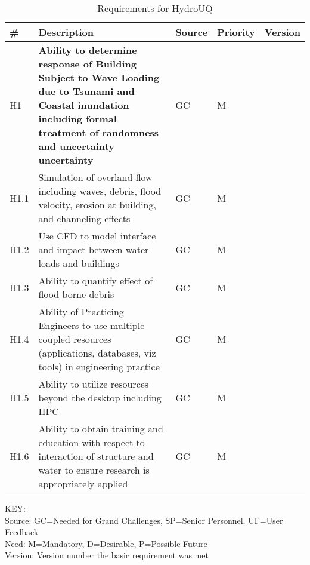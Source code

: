 \begin{longtable}{| p{} | p{} | p{} | p{} |  p{} |}
            
                               \caption{Requirements for HydroUQ} 
\label{tab:featureRequirements}    
 \\
   \hline
\rowcolor{lightgray}
       \# & Description & Source & Priority & Version \\ \hline
       
H1 & \textbf{Ability to determine response of Building Subject to Wave Loading due to Tsunami and Coastal inundation including formal treatment of randomness and uncertainty uncertainty} & GC & M &  \\ \hline
H1.1 & Simulation of overland flow including waves, debris, flood velocity, erosion at building, and channeling effects & GC & M & \\ \hline
H1.2 & Use CFD to model interface and impact between water loads and buildings & GC & M & \\ \hline
H1.3 & Ability to quantify effect of flood borne debris & GC & M & \\ \hline
H1.4 & Ability of Practicing Engineers to use multiple coupled resources (applications, databases, viz tools) in engineering practice & GC & M & \\ \hline
H1.5 & Ability to utilize resources beyond the desktop including HPC & GC & M & \\ \hline
H1.6 & Ability to obtain training and education with respect to interaction of structure and water to ensure research is appropriately applied  & GC & M & \\ \hline

\bottomrule 
             
\end{longtable}

\noindent
KEY:\\
Source: GC=Needed for Grand Challenges, SP=Senior Personnel, UF=User Feedback \\
Need: M=Mandatory, D=Desirable, P=Possible Future \\
Version: Version number the basic requirement was met 


